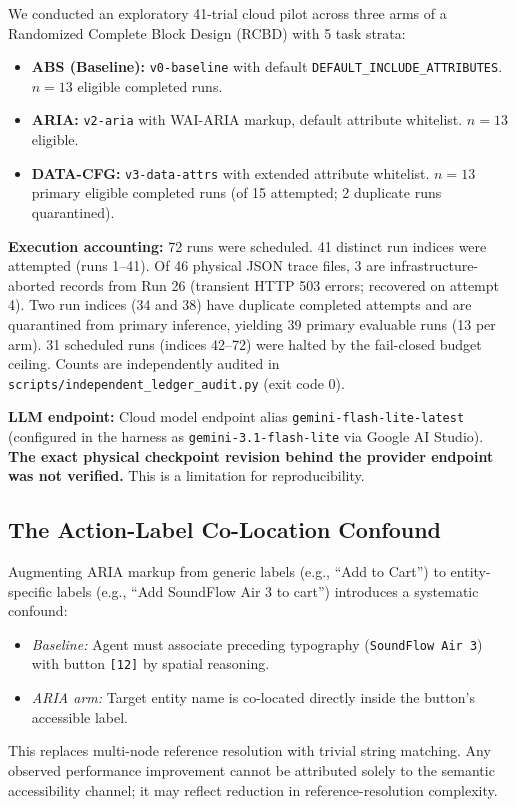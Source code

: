 \documentclass[conference]{IEEEtran}
\begin{document}
We conducted an exploratory 41-trial cloud pilot across three arms of a Randomized Complete Block Design (RCBD) with 5 task strata:
\begin{itemize}
    \item \textbf{ABS (Baseline):} \texttt{v0-baseline} with default \texttt{DEFAULT\_INCLUDE\_ATTRIBUTES}. $n=13$ eligible completed runs.
    \item \textbf{ARIA:} \texttt{v2-aria} with WAI-ARIA markup, default attribute whitelist. $n=13$ eligible.
    \item \textbf{DATA-CFG:} \texttt{v3-data-attrs} with extended attribute whitelist. $n=13$ primary eligible completed runs (of 15 attempted; 2 duplicate runs quarantined).
\end{itemize}
\textbf{Execution accounting:} 72 runs were scheduled. 41 distinct run indices were attempted (runs 1--41). Of 46 physical JSON trace files, 3 are infrastructure-aborted records from Run 26 (transient HTTP 503 errors; recovered on attempt 4). Two run indices (34 and 38) have duplicate completed attempts and are quarantined from primary inference, yielding 39 primary evaluable runs (13 per arm). 31 scheduled runs (indices 42--72) were halted by the fail-closed budget ceiling. Counts are independently audited in \texttt{scripts/independent\_ledger_audit.py} (exit code 0).

\textbf{LLM endpoint:} Cloud model endpoint alias \texttt{gemini-flash-lite-latest} (configured in the harness as \texttt{gemini-3.1-flash-lite} via Google AI Studio). \textbf{The exact physical checkpoint revision behind the provider endpoint was not verified.} This is a limitation for reproducibility.

\subsection{The Action-Label Co-Location Confound}

Augmenting ARIA markup from generic labels (e.g., ``Add to Cart'') to entity-specific labels (e.g., ``Add SoundFlow Air 3 to cart'') introduces a systematic confound:
\begin{itemize}
    \item \textit{Baseline:} Agent must associate preceding typography (\texttt{SoundFlow Air 3}) with button \texttt{[12]} by spatial reasoning.
    \item \textit{ARIA arm:} Target entity name is co-located directly inside the button's accessible label.
\end{itemize}
This replaces multi-node reference resolution with trivial string matching. Any observed performance improvement cannot be attributed solely to the semantic accessibility channel; it may reflect reduction in reference-resolution complexity.
\end{document}
